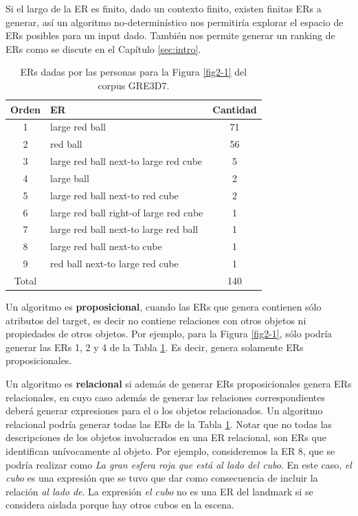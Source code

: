 Si el largo de la ER es finito, dado un contexto finito, existen finitas ERs a generar, as\'i un algoritmo no-determin\'istico nos permitir\'ia explorar el espacio de ERs posibles para un input dado. Tambi\'en nos permite generar un ranking de ERs como se discute en el Cap\'itulo \ref{sec:intro}.
\medskip
\begin{table}[h!]
\begin{center}
\begin{tabular}{|c|l|c|}
\hline
 Orden&ER& Cantidad \\
\hline
1&large red ball & 71 \\
2&red ball & 56 \\ 
3&large red ball next-to large red cube & 5 \\ 
4&large ball & 2 \\ 
5&large red ball next-to red cube & 2 \\ 
6&large red ball right-of large red cube & 1 \\ 
7&large red ball next-to large red ball & 1 \\ 
8&large red ball next-to cube & 1 \\ 
9&red ball next-to large red cube & 1 \\ \hline
Total & &140 \\ \hline
\end{tabular}
\caption{ERs dadas por las personas para la Figura \ref{fig2-1} del corpus GRE3D7.} 
\label{er-gre3d7-stimulus}
\vspace*{-.5cm}
\end{center}
\end{table}

Un algoritmo es {\bf proposicional}, cuando las ERs que genera contienen s\'olo atributos del target, es decir no contiene relaciones con otros objetos ni propiedades de otros objetos. Por ejemplo, para la Figura \ref{fig2-1}, s\'olo podr\'ia generar las ERs 1, 2 y 4 de la Tabla \ref{er-gre3d7-stimulus}. Es decir, genera solamente ERs proposicionales.

Un algoritmo es {\bf relacional} si adem\'as de generar ERs proposicionales genera ERs relacionales, en cuyo caso adem\'as de generar las relaciones correspondientes deber\'a generar expresiones para el o los objetos relacionados. Un algoritmo relacional podr\'ia generar todas las ERs de la Tabla \ref{er-gre3d7-stimulus}. Notar que no todas las descripciones de los objetos involucrados en una ER relacional, son ERs que identifican un\'ivocamente al objeto. Por ejemplo, consideremos la ER 8, que se podr\'ia realizar como {\it La gran esfera roja que est\'a al lado del cubo}. En este caso, {\it el cubo} es una expresi\'on que se tuvo que dar como consecuencia de incluir la relaci\'on {\it al lado de}. La expresi\'on {\it el cubo} no es una ER del landmark si se considera aislada porque hay otros cubos en la escena. 


